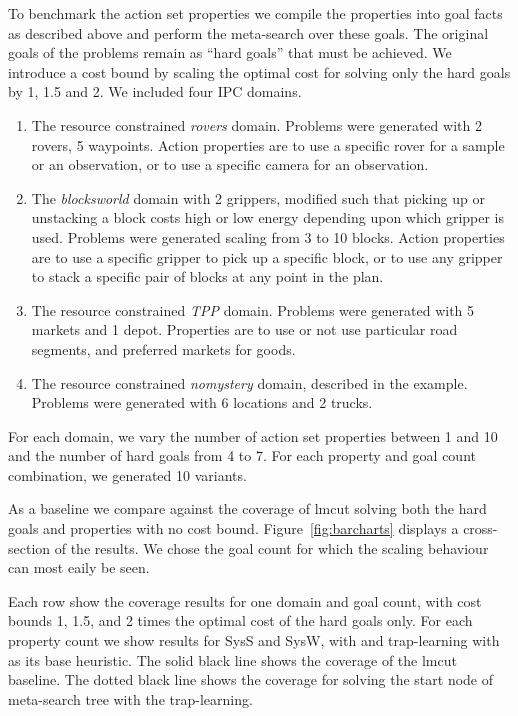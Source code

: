 
To benchmark the action set properties we compile the properties into goal facts as described above and perform the meta-search over these goals. The original goals of the problems remain as ``hard goals'' that must be achieved.
We introduce a cost bound by scaling the optimal cost for solving only the hard goals by 1, 1.5 and 2.
We included four IPC domains.
\begin{enumerate}
\item The resource constrained \textit{rovers} domain. Problems were generated with 2 rovers, 5 waypoints. Action properties are to use a specific rover for a sample or an observation, or to use a specific camera for an observation. 
\item The \textit{blocksworld} domain with 2 grippers, modified such that picking up or unstacking a block costs high or low energy depending upon which gripper is used. Problems were generated scaling from 3 to 10 blocks. Action properties are to use a specific gripper to pick up a specific block, or to use any gripper to stack a specific pair of blocks at any point in the plan.
\item The resource constrained \textit{TPP} domain. Problems were generated with 5 markets and 1 depot. Properties are to use or not use particular road segments, and preferred markets for goods.
\item The resource constrained \textit{nomystery} domain, described in the example. Problems were generated with 6 locations and 2 trucks.
\end{enumerate}
For each domain, we vary the number of action set properties between 1 and 10 and the number of hard goals from 4 to 7. For each property and goal count combination, we generated 10 variants.

As a baseline we compare against the coverage of lmcut solving both the hard goals and properties with no cost bound. Figure~\ref{fig:barcharts} displays a cross-section of the results. We chose the goal count for which the scaling behaviour can most eaily be seen.

Each row show the coverage results for one domain and goal count, with cost bounds 1, 1.5, and 2 times the optimal cost of the hard goals only. For each property count we show results for SysS and SysW, with \hff and trap-learning with \hff as its base heuristic. The solid black line shows the coverage of the lmcut baseline. The dotted black line shows the coverage for solving the start node of meta-search tree with the trap-learning.

